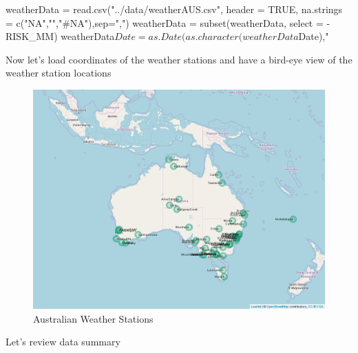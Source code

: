 \begin{Schunk}
\begin{Sinput}
weatherData = read.csv("../data/weatherAUS.csv", header = TRUE, na.strings = c("NA","","#NA"),sep=",")
weatherData = subset(weatherData, select = -RISK_MM)
weatherData$Date = as.Date(as.character(weatherData$Date),"%
\end{Sinput}
\end{Schunk}

Now let's load coordinates of the weather stations and have a bird-eye
view of the weather station locations

\begin{Schunk}
\begin{figure}[H]

{\centering \includegraphics[width=1.1\linewidth]{images/weatherStations} 

}

\caption[Australian Weather Stations]{Australian Weather Stations}\label{fig:map}
\end{figure}
\end{Schunk}

Let's review data summary

